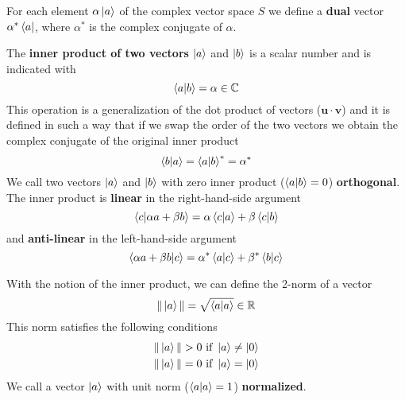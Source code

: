 \documentclass[../Main/chem532-notes.tex]{subfiles}
\begin{document}
For each element $\alpha \ket{a}$ of the complex vector space $S$ we define a \textbf{dual} vector $\alpha^* \bra{a}$, where $\alpha^*$ is the complex conjugate of $\alpha$.

The \textbf{inner product of two vectors} $\ket{a}$ and $\ket{b}$ is a scalar number and is indicated with
\begin{equation}
\braket{a|b} = \alpha \in \mathbb{C}
\end{equation}
This operation is a generalization of the dot product of vectors ($\mathbf{u} \cdot \mathbf{v}$) and it is defined in such a way that if we swap the order of the two vectors we obtain the complex conjugate of the original inner product
\begin{equation}
\label{eq:bg:braket_conjugate}
\braket{b|a}  = \braket{a|b}^* = \alpha^*
\end{equation}
We call two vectors $\ket{a}$ and $\ket{b}$ with zero inner product ($ \braket{a|b} = 0$) \textbf{orthogonal}.
The inner product is \textbf{linear} in the right-hand-side argument
\begin{equation}
\braket{c|\alpha a + \beta b}  = \alpha \braket{c|a} + \beta \braket{c|b} 
\end{equation}
and \textbf{anti-linear} in the left-hand-side argument
\begin{equation}
\braket{\alpha a + \beta b | c}  = \alpha^* \braket{a|c} + \beta^* \braket{b|c} 
\end{equation}


With the notion of the inner product, we can define the 2-norm of a vector
\begin{equation}
\| \ket{a} \| = \sqrt{ \braket{a|a} } \in \mathbb{R} 
\end{equation}
This norm satisfies the following conditions
\begin{equation}
\begin{split}
\| \ket{a} \| > 0 \text{ if } \ket{a} \neq \ket{0} \\
\| \ket{a} \| = 0 \text{ if } \ket{a} = \ket{0}
\end{split}
\end{equation}
We call a vector $\ket{a}$ with unit norm ($\braket{a|a} = 1$) \textbf{normalized}.
\end{document}
